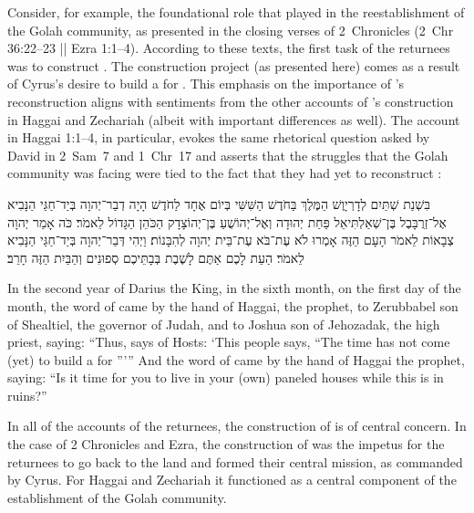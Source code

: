 Consider, for example, the foundational role that \thetemple played in the reestablishment of the Golah community, as presented in the closing verses of 2~Chronicles (2~Chr 36:22--23 || Ezra 1:1--4). According to these texts, the first task of the returnees was to construct \thetemple. The construction project (as presented here) comes as a result of Cyrus's desire to build a \temple for \yahweh. This emphasis on the importance of \thetemple's reconstruction aligns with sentiments from the other accounts of \thetemple's construction in Haggai and Zechariah (albeit with important differences as well). The account in Haggai 1:1--4, in particular, evokes the same rhetorical question asked by David in 2~Sam~7 and 1~Chr~17 and asserts that the struggles that the Golah community was facing were tied to the fact that they had yet to reconstruct \thetemple:
\begin{hebrewtext}
    ‏בִּשְׁנַת שְׁתַּיִם לְדָרְיָוֶשׁ הַמֶּלֶךְ בַּחֹדֶשׁ הַשִּׁשִּׁי בְּיוֹם אֶחָד לַחֹדֶשׁ הָיָה דְבַר־יְהוָה בְּיַד־חַגַּי הַנָּבִיא אֶל־זְרֻבָּבֶל בֶּן־שְׁאַלְתִּיאֵל פַּחַת יְהוּדָה וְאֶל־יְהוֹשֻׁעַ בֶּן־יְהוֹצָדָק הַכֹּהֵן הַגָּדוֹל לֵאמֹר׃ 
    כֹּה אָמַר יְהוָה צְבָאוֹת לֵאמֹר הָעָם הַזֶּה אָמְרוּ לֹא עֶת־בֹּא עֶת־בֵּית יְהוָה לְהִבָּנוֹת׃  
    וַיְהִי דְּבַר־יְהוָה בְּיַד־חַגַּי הַנָּבִיא לֵאמֹר׃ 
    הַעֵת לָכֶם אַתֶּם לָשֶׁבֶת בְּבָתֵּיכֶם סְפוּנִים וְהַבַּיִת הַזֶּה חָרֵב׃
\end{hebrewtext}
\begin{translation}
    In the second year of Darius the King, in the sixth month, on the first day of the month, the word of \yahweh came by the hand of Haggai, the prophet, to Zerubbabel son of Shealtiel, the governor of Judah, and to Joshua son of Jehozadak, the high priest, saying: 
    ``Thus, says \yahweh of Hosts: `This people says, ``The time has not come (yet) to build a \temple for \yahweh''{}'{}''
    And the word of \yahweh came by the hand of Haggai the prophet, saying:
    ``Is it time for you to live in your (own) paneled houses while this \temple is in ruins?''
\end{translation}
\noindent
In all of the accounts of the returnees, the construction of \thetemple is of central concern. In the case of 2 Chronicles and Ezra, the construction of \thetemple was the impetus for the returnees to go back to the land and formed their central mission, as commanded by Cyrus. For Haggai and Zechariah it functioned as a central component of the establishment of the Golah community. 

